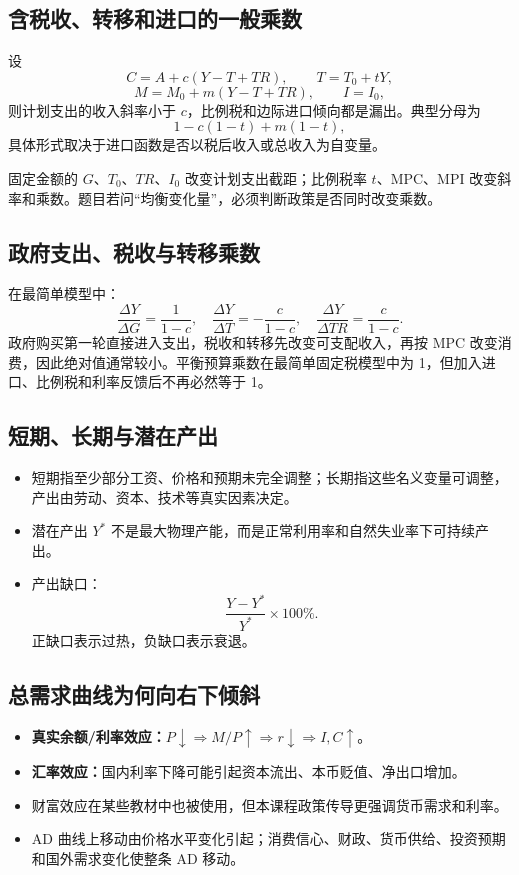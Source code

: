 \documentclass[UTF8,11pt,a4paper]{ctexart}
\newcommand{\term}[1]{\textbf{#1}}
\begin{document}
\subsection{含税收、转移和进口的一般乘数}
设
\[
C=A+c(Y-T+TR),
\qquad T=T_0+tY,
\]
\[
M=M_0+m(Y-T+TR),
\qquad I=I_0,
\]
则计划支出的收入斜率小于 $c$，比例税和边际进口倾向都是漏出。典型分母为
\[
1-c(1-t)+m(1-t),
\]
具体形式取决于进口函数是否以税后收入或总收入为自变量。

\begin{detailbox}[先看自主项还是斜率]
固定金额的 $G$、$T_0$、$TR$、$I_0$ 改变计划支出截距；比例税率 $t$、MPC、MPI 改变斜率和乘数。题目若问“均衡变化量”，必须判断政策是否同时改变乘数。
\end{detailbox}

\subsection{政府支出、税收与转移乘数}
在最简单模型中：
\[
\frac{\Delta Y}{\Delta G}=\frac1{1-c},
\quad
\frac{\Delta Y}{\Delta T}=-\frac{c}{1-c},
\quad
\frac{\Delta Y}{\Delta TR}=\frac{c}{1-c}.
\]
政府购买第一轮直接进入支出，税收和转移先改变可支配收入，再按 MPC 改变消费，因此绝对值通常较小。平衡预算乘数在最简单固定税模型中为 1，但加入进口、比例税和利率反馈后不再必然等于 1。

\subsection{短期、长期与潜在产出}
\begin{itemize}
  \item 短期指至少部分工资、价格和预期未完全调整；长期指这些名义变量可调整，产出由劳动、资本、技术等真实因素决定。
  \item 潜在产出 $Y^*$ 不是最大物理产能，而是正常利用率和自然失业率下可持续产出。
  \item 产出缺口：
  \[
  \frac{Y-Y^*}{Y^*}\times100\%.
  \]
  正缺口表示过热，负缺口表示衰退。
\end{itemize}

\subsection{总需求曲线为何向右下倾斜}
\begin{itemize}
  \item \term{真实余额/利率效应：}$P\downarrow\Rightarrow M/P\uparrow\Rightarrow r\downarrow\Rightarrow I,C\uparrow$。
  \item \term{汇率效应：}国内利率下降可能引起资本流出、本币贬值、净出口增加。
  \item 财富效应在某些教材中也被使用，但本课程政策传导更强调货币需求和利率。
  \item AD 曲线上移动由价格水平变化引起；消费信心、财政、货币供给、投资预期和国外需求变化使整条 AD 移动。
\end{itemize}
\end{document}

